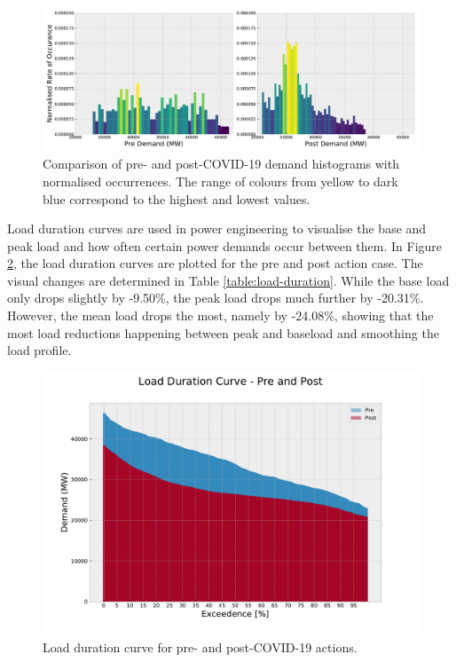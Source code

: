 \documentclass[energies,article,submit,moreauthors,pdftex]{Definitions/mdpi}
\begin{document}

\begin{figure}[H] 
\centering
\hspace{-25pt}\includegraphics[width=16.5 cm]{Graphics/Demand_hist_coloured_sidebyside.pdf}
\caption{Comparison of pre- and post-COVID-19 demand histograms with normalised occurrences. The range of colours from yellow to dark blue correspond to the highest and lowest values.}\label{fig:Demand_hist}
\end{figure}  

Load duration curves are used in power engineering to visualise the base and peak load and how often certain power demands occur between them. In Figure \ref{fig:load_duration}, the load duration curves are plotted for the pre and post action case. The visual changes are determined in Table \ref{table:load-duration}. While the base load only drops slightly by -9.50\%, the peak load drops much further by -20.31\%. However, the mean load drops the most, namely by -24.08\%, showing that the most load reductions happening between peak and baseload and smoothing the load profile.  

\begin{figure}[]
\centering
\hspace{-25pt}\includegraphics[width=9 cm]{Graphics/Load_duration_curve.pdf}
\caption{Load duration curve for pre- and post-COVID-19 actions.}\label{fig:load_duration}
\end{figure}  
\end{document}
